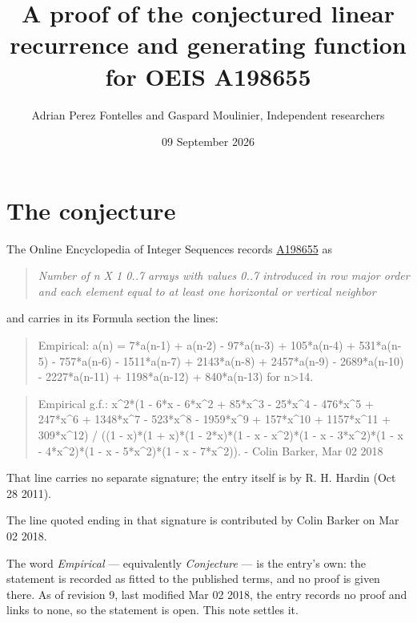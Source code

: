 \documentclass[11pt]{article}
\title{A proof of the conjectured linear recurrence and generating function for OEIS A198655}
\author{Adrian Perez Fontelles and Gaspard Moulinier, Independent researchers}
\date{09 September 2026}
\theoremstyle{definition}
\begin{document}
\maketitle
\section{The conjecture}

The Online Encyclopedia of Integer Sequences records \href{https://oeis.org/A198655}{A198655} as

\begin{quote}\itshape Number of n X 1 0..7 arrays with values 0..7 introduced in row major order and each element equal to at least one horizontal or vertical neighbor\end{quote}

and carries in its Formula section the lines:

\begin{quote}\ttfamily Empirical: a(n) = 7*a(n-1) + a(n-2) - 97*a(n-3) + 105*a(n-4) + 531*a(n-5) - 757*a(n-6) - 1511*a(n-7) + 2143*a(n-8) + 2457*a(n-9) - 2689*a(n-10) - 2227*a(n-11) + 1198*a(n-12) + 840*a(n-13) for n>14.\end{quote}

\begin{quote}\ttfamily Empirical g.f.: x\textasciicircum{}2*(1 - 6*x - 6*x\textasciicircum{}2 + 85*x\textasciicircum{}3 - 25*x\textasciicircum{}4 - 476*x\textasciicircum{}5 + 247*x\textasciicircum{}6 + 1348*x\textasciicircum{}7 - 523*x\textasciicircum{}8 - 1959*x\textasciicircum{}9 + 157*x\textasciicircum{}10 + 1157*x\textasciicircum{}11 + 309*x\textasciicircum{}12) / ((1 - x)*(1 + x)*(1 - 2*x)*(1 - x - x\textasciicircum{}2)*(1 - x - 3*x\textasciicircum{}2)*(1 - x - 4*x\textasciicircum{}2)*(1 - x - 5*x\textasciicircum{}2)*(1 - x - 7*x\textasciicircum{}2)). - Colin Barker, Mar 02 2018\end{quote}

That line carries no separate signature; the entry itself is by R. H. Hardin (Oct 28 2011).

The line quoted ending in that signature is contributed by Colin Barker on Mar 02 2018.

The word {\itshape Empirical} --- equivalently {\itshape Conjecture} --- is the entry's own: the statement is recorded as fitted to the published terms, and no proof is given there. As of revision 9, last modified Mar 02 2018, the entry records no proof and links to none, so the statement is open. This note settles it.
\end{document}
